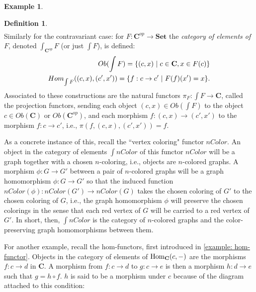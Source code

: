 \documentclass[a4paper]{book}
\theoremstyle{definition}
\newtheorem{example}{Example}[section]
\theoremstyle{definition}
\newtheorem{definition}{Definition}[section]
\theoremstyle{definition}
\theoremstyle{theorem}
\theoremstyle{definition}
\begin{document}
\begin{example}
\begin{definition}
\begin{equation}
\begin{split}
		\end{split}
		\end{equation}
		Similarly for the contravariant case: for $F: \textbf{C}^{op} \rightarrow \textbf{Set}$ the \textit{category of elements of} $F$, denoted $\int_{\textbf{C}^{op}} F$ (or just $\int F$), is defined: 
		\begin{equation}
		\begin{split}
		Ob(\int F) = \{(c, x) \hspace*{0.3em}| \hspace*{0.3em} c \in \textbf{C}, x \in F(c) \} \\
		Hom_{\int F}((c,x), (c', x')) = \{f: c \rightarrow c' \hspace*{0.3em} | \hspace*{0.3em} F(f)(x') = x\}.
		\end{split}
		\end{equation}
		Associated to these constructions are the natural functors $\pi_{F}: \int F \rightarrow \textbf{C}$, called the projection functors, sending each object $(c, x) \in Ob(\int F)$ to the object $c \in Ob(\textbf{C})$ or $Ob(\textbf{C}^{op})$, and each morphism $f: (c, x) \rightarrow (c', x')$ to the morphism $f: c \rightarrow c'$, i.e., $\pi(f, (c, x), (c', x')) = f$. 
	\end{definition} \noindent 
	As a concrete instance of this, recall the ``vertex coloring" functor $nColor$.  An object in the category of elements $\int nColor$ of this functor $nColor$ will be a graph together with a chosen $n$-coloring, i.e., objects are $n$-colored graphs. A morphism $\phi: G \rightarrow G'$ between a pair of $n$-colored graphs will be a graph homomorphism $\phi: G \rightarrow G'$ so that the induced function $nColor(\phi): nColor(G') \rightarrow nColor(G)$ takes the chosen coloring of $G'$ to the chosen coloring of $G$, i.e., the graph homomorphism $\phi$ will preserve the chosen colorings in the sense that each red vertex of $G$ will be carried to a red vertex of $G'$. In short, then, $\int nColor$ is the category of $n$-colored graphs and the color-preserving graph homomorphisms between them. \par 
	For another example, recall the hom-functors, first introduced in \ref{example: hom-functor}. Objects in the category of elements of $\text{Hom}_{\textbf{C}}(c, \--)$ are the morphisms $f: c \rightarrow d$ in \textbf{C}. A morphism from $f: c \rightarrow d$ to $g: c \rightarrow e$ is then a morphism $h: d \rightarrow e$ such that $g = h \circ f$. $h$ is said to be a morphism under $c$ because of the diagram attached to this condition: 

\end{example}
\end{document}

